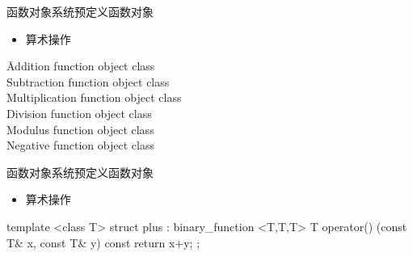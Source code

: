 \begin{frame}[t, fragile]{函数对象}{系统预定义函数对象}
  \begin{itemize}
  \item 算术操作
  \end{itemize}
  \begin{tabbing}
     \hspace{3em} \= Addition function object class\\ 
     \> Subtraction function object class\\
     \> Multiplication function object class\\
     \> Division function object class\\
     \> Modulus function object class\\
     \> Negative function object class 
  \end{tabbing}
\end{frame}

\begin{frame}[t, fragile]{函数对象}{系统预定义函数对象}%
  \begin{itemize}
  \item 算术操作    
  \end{itemize}
  \begin{center}
    \begin{minipage}[t]{0.65\linewidth}
      \begin{cppttnobg}
template <class T>
struct plus : binary_function <T,T,T>
{
  T operator() (const T& x, const T& y) const
  {
    return x+y;
  }
};
      \end{cppttnobg}
    \end{minipage}
  \end{center}
\end{frame}

